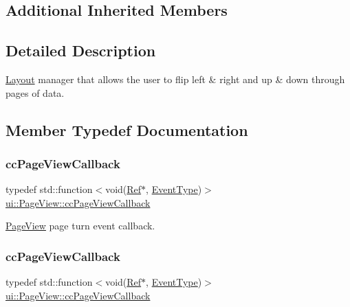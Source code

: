 \subsection*{Additional Inherited Members}


\subsection{Detailed Description}
\hyperlink{classui_1_1Layout}{Layout} manager that allows the user to flip left \& right and up \& down through pages of data. 

\subsection{Member Typedef Documentation}
\mbox{\label{classui_1_1PageView_a1cbaf2e41005380574beae96ac2bc136}} 
\subsubsection{\texorpdfstring{cc\+Page\+View\+Callback}{ccPageViewCallback}\hspace{0.1cm}{\footnotesize\ttfamily [1/2]}}
{\footnotesize\ttfamily typedef std\+::function$<$void(\hyperlink{classRef}{Ref}$\ast$, \hyperlink{classui_1_1ListView_a7ef851492220e4bccadbaf16d95d26b9}{Event\+Type})$>$ \hyperlink{classui_1_1PageView_a1cbaf2e41005380574beae96ac2bc136}{ui\+::\+Page\+View\+::cc\+Page\+View\+Callback}}

\hyperlink{classui_1_1PageView}{Page\+View} page turn event callback. \mbox{\label{classui_1_1PageView_a1cbaf2e41005380574beae96ac2bc136}} 
\subsubsection{\texorpdfstring{cc\+Page\+View\+Callback}{ccPageViewCallback}\hspace{0.1cm}{\footnotesize\ttfamily [2/2]}}
{\footnotesize\ttfamily typedef std\+::function$<$void(\hyperlink{classRef}{Ref}$\ast$, \hyperlink{classui_1_1ListView_a7ef851492220e4bccadbaf16d95d26b9}{Event\+Type})$>$ \hyperlink{classui_1_1PageView_a1cbaf2e41005380574beae96ac2bc136}{ui\+::\+Page\+View\+::cc\+Page\+View\+Callback}}

